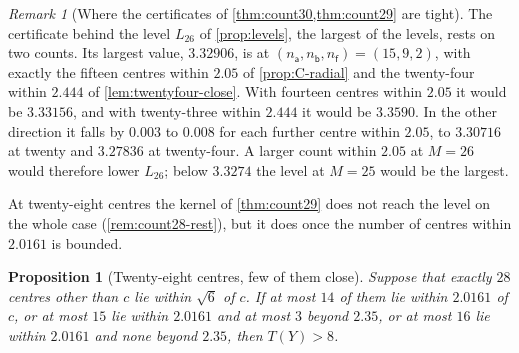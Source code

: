\documentclass[11pt,reqno]{amsart}
\renewcommand{\_}{\origunderscore\allowbreak}
\numberwithin{equation}{section}
\theoremstyle{plain}
\newtheorem{prop}[thm]{Proposition}
\theoremstyle{definition}
\theoremstyle{remark}
\newtheorem{remark}[thm]{Remark}
\begin{document}
\begin{remark}[Where the certificates of \cref{thm:count30,thm:count29} are tight]
The certificate behind the level $L_{26}$ of \cref{prop:levels}, the
largest of the levels, rests on two counts. Its largest value, $3.32906$, is
at $(n_{\mathsf a},n_{\mathsf b},n_{\mathsf f})=(15,9,2)$, with exactly the
fifteen centres within $2.05$ of \cref{prop:C-radial} and the twenty-four
within $2.444$ of \cref{lem:twentyfour-close}. With fourteen centres within
$2.05$ it would be $3.33156$, and with twenty-three within $2.444$ it would
be $3.3590$. In the other direction it falls by $0.003$ to $0.008$ for each
further centre within $2.05$, to $3.30716$ at twenty and $3.27836$ at
twenty-four. A larger count within $2.05$ at $M=26$ would therefore lower
$L_{26}$; below $3.3274$ the level at $M=25$ would be the largest.
\end{remark}

At twenty-eight centres the kernel of \cref{thm:count29} does not reach
the level on the whole case (\cref{rem:count28-rest}), but it does once the
number of centres within $2.0161$ is bounded.

\begin{prop}[Twenty-eight centres, few of them close]\label{prop:count28-few}
Suppose that exactly $28$ centres other than $c$ lie within $\sqrt6$ of $c$.
If at most $14$ of them lie within $2.0161$ of $c$, or at most $15$ lie
within $2.0161$ and at most $3$ beyond $2.35$, or at most $16$ lie within
$2.0161$ and none beyond $2.35$, then $T(Y)>8$.
\end{prop}
\end{document}
